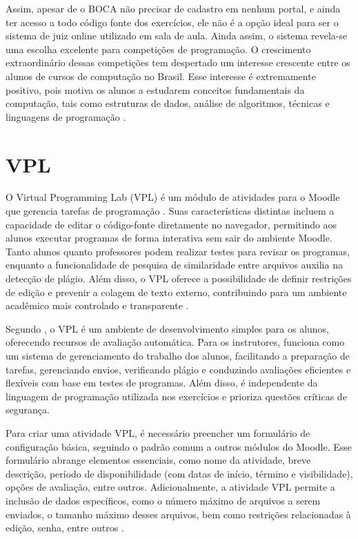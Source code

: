 Assim, apesar de o BOCA não precisar de cadastro em nenhum portal, e ainda ter acesso a todo código fonte dos exercícios, ele não é a opção ideal para ser o sistema de juiz online utilizado em sala de aula. Ainda assim, o sistema revela-se uma escolha excelente para competições de programação. O crescimento extraordinário dessas competições tem despertado um interesse crescente entre os alunos de cursos de computação no Brasil. Esse interesse é extremamente positivo, pois motiva os alunos a estudarem conceitos fundamentais da computação, tais como estruturas de dados, análise de algoritmos, técnicas e linguagens de programação \cite[p.~11]{camposferreira}.

\section{VPL}

O Virtual Programming Lab (VPL) é um módulo de atividades para o Moodle que gerencia tarefas de programação \cite{vpl}. Suas características distintas incluem a capacidade de editar o código-fonte diretamente no navegador, permitindo aos alunos executar programas de forma interativa sem sair do ambiente Moodle. Tanto alunos quanto professores podem realizar testes para revisar os programas, enquanto a funcionalidade de pesquisa de similaridade entre arquivos auxilia na detecção de plágio. Além disso, o VPL oferece a possibilidade de definir restrições de edição e prevenir a colagem de texto externo, contribuindo para um ambiente acadêmico mais controlado e transparente \cite{vpl}.

Segundo \textcite[p.~1]{rodriguezdelpinoandroyo}, o VPL é um ambiente de desenvolvimento simples para os alunos, oferecendo recursos de avaliação automática. Para os instrutores, funciona como um sistema de gerenciamento do trabalho dos alunos, facilitando a preparação de tarefas, gerenciando envios, verificando plágio e conduzindo avaliações eficientes e flexíveis com base em testes de programas. Além disso, é independente da linguagem de programação utilizada nos exercícios e prioriza questões críticas de segurança.

Para criar uma atividade VPL, é necessário preencher um formulário de configuração básica, seguindo o padrão comum a outros módulos do Moodle. Esse formulário abrange elementos essenciais, como nome da atividade, breve descrição, período de disponibilidade (com datas de início, término e visibilidade), opções de avaliação, entre outros. Adicionalmente, a atividade VPL permite a inclusão de dados específicos, como o número máximo de arquivos a serem enviados, o tamanho máximo desses arquivos, bem como restrições relacionadas à edição, senha, entre outros \cite{vpl}.

